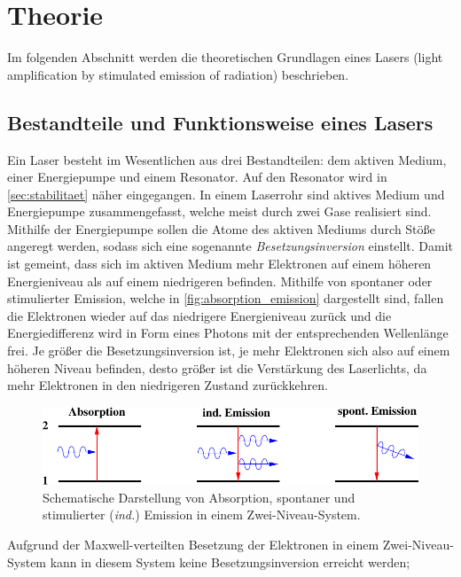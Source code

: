 \section{Theorie}
\label{sec:theorie}

    Im folgenden Abschnitt werden die theoretischen Grundlagen eines Lasers (light amplification by stimulated emission of radiation) beschrieben.

\subsection{Bestandteile und Funktionsweise eines Lasers}

    Ein Laser besteht im Wesentlichen aus drei Bestandteilen:
    dem aktiven Medium, einer Energiepumpe und einem Resonator.
    Auf den Resonator wird in \autoref{sec:stabilitaet} näher eingegangen.
    In einem Laserrohr sind aktives Medium und Energiepumpe zusammengefasst,
    welche meist durch zwei Gase realisiert sind.
    Mithilfe der Energiepumpe sollen die Atome des aktiven Mediums durch Stöße angeregt werden,
    sodass sich eine sogenannte \textit{Besetzungsinversion} einstellt.
    Damit ist gemeint,
    dass sich im aktiven Medium mehr Elektronen auf einem höheren Energieniveau als auf einem niedrigeren befinden.
    Mithilfe von spontaner oder stimulierter Emission,
    welche in \autoref{fig:absorption_emission} dargestellt sind,
    fallen die Elektronen wieder auf das niedrigere Energieniveau zurück
    und die Energiedifferenz wird in Form eines Photons mit der entsprechenden Wellenlänge frei.
    Je größer die Besetzungsinversion ist,
    je mehr Elektronen sich also auf einem höheren Niveau befinden,
    desto größer ist die Verstärkung des Laserlichts,
    da mehr Elektronen in den niedrigeren Zustand zurückkehren.
    \begin{figure}[H]
       \centering
       \includegraphics[width=\textwidth]{content/img/Altanleitung/Abb_1_edit.pdf}
       \caption{Schematische Darstellung von Absorption, spontaner und stimulierter (\textit{ind.}) Emission in einem Zwei-Niveau-System.}
       \label{fig:absorption_emission}
    \end{figure}
    Aufgrund der Maxwell-verteilten Besetzung der Elektronen in einem Zwei-Niveau-System kann in diesem System keine Besetzungsinversion erreicht werden;
